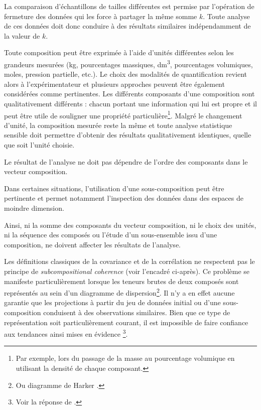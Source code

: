 \documentclass[
  french,
]{scrbook}
\providecommand{\tightlist}{%
  \setlength{\itemsep}{0pt}\setlength{\parskip}{0pt}}
\begin{document}
\begin{description}
\tightlist
\item[\emph{Scale invariance}]
La comparaison d'échantillons de tailles différentes est permise par l'opération de fermeture des données qui les force à partager la même somme \(k\). Toute analyse de ces données doit donc conduire à des résultats similaires indépendamment de la valeur de \(k\).
\item[\emph{Perturbation invariance}]
Toute composition peut être exprimée à l'aide d'unités différentes selon les grandeurs mesurées (kg, pourcentages massiques, dm\textsuperscript{3}, pourcentages volumiques, moles, pression partielle, etc.). Le choix des modalités de quantification revient alors à l'expérimentateur et plusieurs approches peuvent être également considérées comme pertinentes. Les différents composants d'une composition sont qualitativement différents : chacun portant une information qui lui est propre et il peut être utile de souligner une propriété particulière\footnote{Par exemple, lors du passage de la masse au pourcentage volumique en utilisant la densité de chaque composant.}. Malgré le changement d'unité, la composition mesurée reste la même et toute analyse statistique sensible doit permettre d'obtenir des résultats qualitativement identiques, quelle que soit l'unité choisie.
\item[\emph{Permutation invariance}]
Le résultat de l'analyse ne doit pas dépendre de l'ordre des composants dans le vecteur composition.
\item[\emph{Subcompositional coherence}]
Dans certaines situations, l'utilisation d'une sous-composition peut être pertinente et permet notamment l'inspection des données dans des espaces de moindre dimension.
\end{description}

Ainsi, ni la somme des composants du vecteur composition, ni le choix des unités, ni la séquence des composés ou l'étude d'un sous-ensemble issu d'une composition, ne doivent affecter les résultats de l'analyse.

Les définitions classiques de la covariance et de la corrélation ne respectent pas le principe de \emph{subcompositional coherence} (voir l'encadré ci-après). Ce problème se manifeste particulièrement lorsque les teneurs brutes de deux composés sont représentés au sein d'un diagramme de dispersion\footnote{Ou diagramme de Harker \autocite[p.~119]{harker1909}.}. Il n'y a en effet aucune garantie que les projections à partir du jeu de données initial ou d'une sous-composition conduisent à des observations similaires. Bien que ce type de représentation soit particulièrement courant, il est impossible de faire confiance aux tendances ainsi mises en évidence \autocite{aitchison2005}\footnote{Voir la réponse de \textcite{cortes2009}.}.
\end{document}
